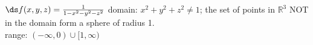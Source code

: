 {$\ds f(x,y,z) = \frac{1}{1-x^2-y^2-z^2}$
}
{domain: $x^2+y^2+z^2\neq 1$; the set of points in $\mathbb{R}^3$ NOT in the domain form a sphere of radius 1.\\
range: $(-\infty,0)\cup[1,\infty)$
}
